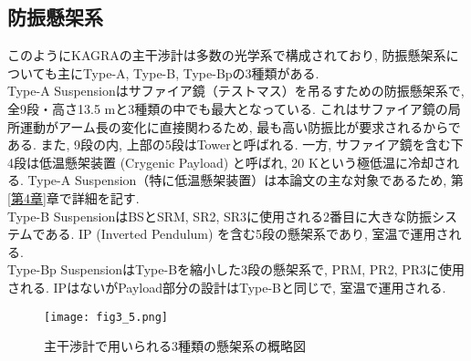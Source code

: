 \subsection{防振懸架系}
このようにKAGRAの主干渉計は多数の光学系で構成されており, 防振懸架系についても主にType-A, Type-B, Type-Bpの3種類がある. \\
\quad Type-A Suspensionはサファイア鏡（テストマス）を吊るすための防振懸架系で, 全9段・高さ13.5 mと3種類の中でも最大となっている. これはサファイア鏡の局所運動がアーム長の変化に直接関わるため, 最も高い防振比が要求されるからである. また, 9段の内, 上部の5段はTowerと呼ばれる. 一方, サファイア鏡を含む下4段は低温懸架装置 (Crygenic Payload) と呼ばれ, 20 Kという極低温に冷却される. Type-A Suspension（特に低温懸架装置）は本論文の主な対象であるため, 第\ref{第4章}章で詳細を記す. \\
\quad Type-B SuspensionはBSとSRM, SR2, SR3に使用される2番目に大きな防振システムである. IP (Inverted Pendulum) を含む5段の懸架系であり, 室温で運用される. \\
\quad Type-Bp SuspensionはType-Bを縮小した3段の懸架系で, PRM, PR2, PR3に使用される. IPはないがPayload部分の設計はType-Bと同じで, 室温で運用される. 
\begin{figure}[H]
\begin{center}
\texttt{[image: fig3\_5.png]}
\caption[3種類の懸架系]{主干渉計で用いられる3種類の懸架系の概略図}
\end{center}
\end{figure}

